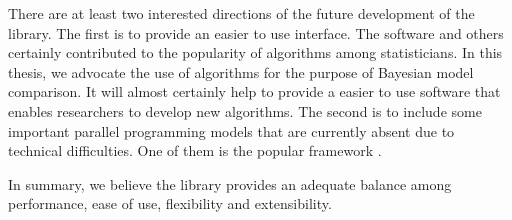 There are at least two interested directions of the future development of the
library. The first is to provide an easier to use interface. The \bugs
software and others certainly contributed to the popularity of \mcmc
algorithms among statisticians. In this thesis, we advocate the use of \smc
algorithms for the purpose of Bayesian model comparison. It will almost
certainly help to provide a easier to use software that enables researchers to
develop new algorithms. The second is to include some important parallel
programming models that are currently absent due to technical difficulties.
One of them is the popular \cuda framework \cite{cuda}.

In summary, we believe the \vsmc library provides an adequate balance among
performance, ease of use, flexibility and extensibility.
